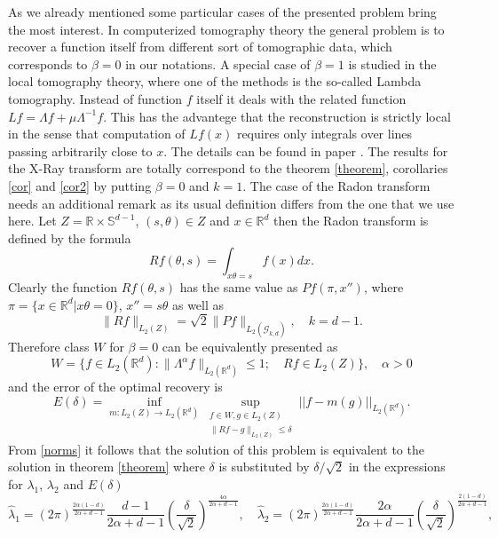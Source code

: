 \documentclass[12pt]{iopart}
\begin{document}
	As we already mentioned some particular cases of the presented problem bring the most interest. In computerized tomography theory the general problem is to recover a function itself from different sort of tomographic data, which corresponds to $\beta=0$ in our notations. A special case of $\beta=1$ is studied in the local tomography theory, where one of the methods is the so-called Lambda tomography. Instead of function $f$ itself it deals with the related function $Lf = \Lambda f+\mu\Lambda^{-1}f$. This has the advantege that the reconstruction is strictly local in the sense that computation of $Lf(x)$ requires only integrals over lines passing arbitrarily close to $x$. The details can be found in paper \cite{FKNRS}.
	The results for the X-Ray transform are totally correspond to the theorem \ref{theorem}, corollaries \ref{cor} and \ref{cor2} by putting $\beta=0$ and $k=1$. The case of the Radon transform needs an additional remark as its usual definition differs from the one that we use here. Let $Z=\mathbb R\times\mathbb S^{d-1}$, $(s,\theta)\in Z$ and $x\in\mathbb R^d$ then the Radon transform is defined by the formula 
	$$Rf(\theta,s)=\int_{x\theta=s}f(x)dx.$$
	Clearly the function $Rf(\theta,s)$ has the same value as $Pf(\pi,x'')$, where $\pi=\{x\in\mathbb R^d | x\theta=0\}$, $x''=s\theta$ as well as
	\begin{equation}
	\label{norms}
	\|Rf\|_{L_2(Z)}=\sqrt{2}\|Pf\|_{L_2(\mathcal G_{k,d})},\quad k=d-1.
	\end{equation}
	Therefore class $W$ for $\beta=0$ can be equivalently presented as 
	$$ W=\{f\in L_2(\mathbb R^d) :
	\|\Lambda^\alpha f\|_{L_2(\mathbb R^d)}\leqslant  1;\quad Rf\in L_2(Z) \},\quad\alpha>0$$
	and the error of the optimal recovery is
	$$
	E(\delta)=\inf_{m:L_2(Z)\rightarrow L_2(\mathbb R^d)}\sup_{
		\begin{smallmatrix}
		f\in W, g\in L_2(Z)\\ 
		\|Rf-g\|_{L_2(Z)}\leqslant \delta
		\end{smallmatrix}} ||f-m(g)||_{L_2(\mathbb R^d)}.
	$$
	From \eqref{norms} it follows that the solution of this problem is equivalent to the solution in theorem \ref{theorem} where $\delta$ is substituted by $\delta/\sqrt{2}$ in the expressions for $\lambda_1$, $\lambda_2$ and $E(\delta)$
	$$
	\widehat\lambda_1=(2\pi)^{\frac{2\alpha(1-d)}{2\alpha+d-1}}\frac{d-1}{2\alpha+d-1}\left(\frac{\delta}{\sqrt{2}}\right)^\frac{4\alpha}{2\alpha+d-1},\quad \widehat\lambda_2=(2\pi)^{\frac{2\alpha(1-d)}{2\alpha+d-1}}\frac{2\alpha}{2\alpha+d-1}\left(\frac{\delta}{\sqrt{2}}\right)^\frac{2(1-d)}{2\alpha+d-1}, 
	$$
\end{document}
